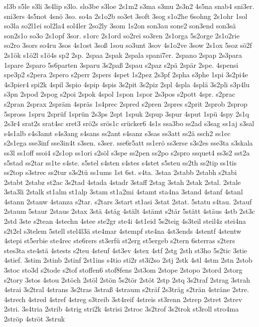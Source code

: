 {sl3b
s5le
s3li
3s4lip
s3lo.
slo3be
s3loe
2s1m2
s3ma
s3mu
2s3n2
4s5na
snab4
sni3er.
sni3ers
4s5not
4snö
3so.
so4a
2s1o2b
so3et
3soft
3sog
s1o2he
6sohng
2s1ohr
1sol
so3la
so2l1ei
sol2la4
sol4ler
2so2ly
3som
1s2on
son3au
sone2
son3end
son3sä
son2s1o
so3o
2s1opf
3sor.
s1orc
2s1ord
so2rei
so3ren
2s1orga
5s2orge
2s1o2rie
so2ro
3sors
so4ru
3sos
4s1ost
3soß
1sou
so3unt
3sov
4s1o2ve
3sow
2s1ox
5soz
sö2f
2s1ök
s1ö2l
s1ö4s
sp2
2sp.
2spaa
2spak
2spala
spani7er.
2spano
2spap
2s3para
1spare
2sparo
5s6parten
3sparu
3s2paß
2spau
s2paz
s2pä
2spär
2spe.
4spensi
spe3p2
s2pera
2spero
s2perr
2spers
4spet
1s2pez
2s3pf
2spha
s3phe
1spi
3s2pi4e
4s3pier4
spi2k
4spil
3spio
4spip
4spis
3s2pit
3s2piz
2spl
4spla
4splä
3s2pli
s3p4lu
s3pn
2spod
2spog
s2poi
2spok
4spol
1spon
1spor
2s3pos
s2pott
4spr.
s2prac
s2pran
2sprax
2spräm
4spräs
1s4prec
2spred
s2pren
2spres
s2prit
2sprob
2sprop
5spross
1spru
2sprüf
1sprün
2s3ps
2spt
1spuk
2spup
3spur
4sput
1spü
4spy
2s1q
2s3r4
srat2s
srat4sc
sret3
srö2s
srös1c
srücker6
4s1s
ssa3bo
ss2ad
s3sag
ss1aj
s3sal
s4s1alb
s4s3amt
s4s3ang
s4sans
ss2ant
s4sanz
s3sas
ss3att
ss2ä
ssch2
ss1ec
s2s1ega
sse3inf
sse3in4t
s3sen.
s3ser.
sse6r5att
ss1erö
ss3erse
s3s2es
sse3ta
s3skala
ss3l
ss1off
ssoi4
s2s1op
ss1ori
s2söl
s3spe
ss2pen
ss2po
s2spro
ssquet4
ss3s2
sst2a
s5stad
ss2tar
ss1te
s4ste.
s5stel
s4sten
s4stes
s4stet
s5steu
ss2th
ss2tip
ss1tis
ss2top
s3strec
ss2tur
s3s2tü
ss1ums
1st
6st.
s4ta.
3staa
2stabb
2stabh
s2tabi
2stabt
2stabz
st2ac
3s2tad
4stada
4stadr
3staff
2stag
3stah
2stak
2stal.
2stale
3sta3li
2stalk
st1alm
st1alp
3stam
st1a2mi
4stamt
sta4na
3stand
4stanf
4stanl
4stann
2stanw
4stanza
s2tar.
s2tars
3start
st1asi
3stat
2stat.
5statu
s4tau.
2stauf
2staum
5staur
2staus
2stax
3stä
4stäg
4stält
4stämt
s2tär
5stätt
4stäus
4stb
2st3c
2std
3ste
s2tean
4stechn
4stee
ste2gr
ste4i
4st1eid
5s2teig
4s3teil
steil4z
stei4na
s2t2el
s3telem
5stell
stel4l3ä
ste4mar
4stempf
ste4na
4st3ends
4stentf
4stentw
4stepi
st5erbie
ste4rec
ste6rers
st3erfü
st2erg
st5ergeb
s2tern
6sterras
s2ters
stes3ta
ste4stä
4stests
s2teu
4steuf
4st3ev
4stex
4stf
2stg
2sth
st3ho
5s2tic
3stie
4stief.
3stim
2stinb
2stinf
2st1ins
s4tio
sti2r
st3i2so
2stj
2stk
4stl
4stm
2stn
2stob
3stoc
sto3d
s2tode
s2tof
stoffen6
stof8fens
2st3om
2stope
2stopo
2stord
2storg
s2tory
3stos
4stou
2stöch
2stöl
2stön
5s2tör
2stöt
2stp
2stq
3s2traf
2strag
3strah
4strai
3s2tral
4strans
3s2tras
3straß
4straum
s2träf
2s3träg
s2trän
4sträne
2stre.
4strech
4stred
4stref
4streg
s3treib
3st4reif
4streis
st3renn
2strep
2stret
2strev
2stri.
3s4tria
2strib
4strig
stri2k
4strisi
2stroc
3s2trof
3s2trok
st3roll
stro4ma
2ströp
4ströt
3struk
}

